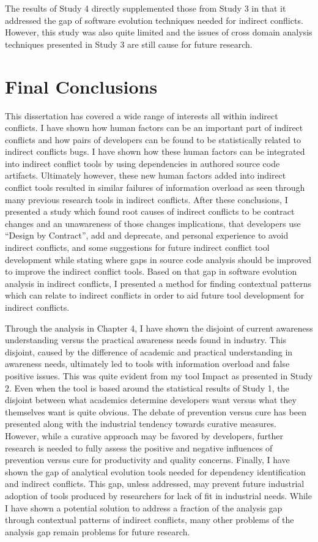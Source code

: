The results of Study 4 directly supplemented those from Study 3 in that it addressed the gap of software evolution techniques
needed for indirect conflicts. However, this study was also quite limited and the issues of cross domain analysis techniques
presented in Study 3 are still cause for future research.

\section{Final Conclusions}

This dissertation has covered a wide range of interests all within indirect conflicts. I have shown how human factors can
be an important part of indirect conflicts and how pairs of developers can be found to be statistically related to indirect
conflicts bugs. I have shown how these human factors can be integrated into indirect conflict tools by using dependencies in 
authored source code artifacts. Ultimately however, these new human factors added into indirect conflict tools resulted in
similar failures of information overload as seen through many previous research tools in indirect conflicts. After these conclusions,
I presented a study which found root causes of indirect conflicts to be contract changes and an unawareness of those changes
implications, that developers use ``Design by Contract'', add and deprecate, and personal experience to avoid indirect conflicts,
and some suggestions for future indirect conflict tool development while stating where gaps in source code analysis should
be improved to improve the indirect conflict tools. Based on that gap in
software evolution analysis in indirect conflicts, I presented a method for finding contextual patterns which can relate to
indirect conflicts in order to aid future tool development for indirect conflicts.


Through the analysis in Chapter 4, I have shown the disjoint of current awareness understanding versus the practical
awareness needs found in industry. This disjoint, caused by the difference of academic and practical understanding in awareness needs,
ultimately led to tools with information overload and false positive issues. This was quite evident from my tool Impact as
presented in Study 2. Even when the tool is based around the statistical results of Study 1, the disjoint between what academics
determine developers want versus what they themselves want is quite obvious. The debate of prevention versus cure has been presented along with
the industrial tendency towards curative measures. However, while a curative approach may be favored by developers, further research is needed
to fully assess the positive and negative influences of prevention versus cure for productivity and quality concerns. Finally, I have shown
the gap of analytical evolution tools needed for dependency identification and indirect conflicts. This gap, unless addressed, may prevent
future industrial adoption of tools produced by researchers for lack of fit in industrial needs. While I have shown a potential solution to address
a fraction of the analysis gap through contextual patterns of indirect conflicts, many other problems of the analysis gap remain problems
for future research.
